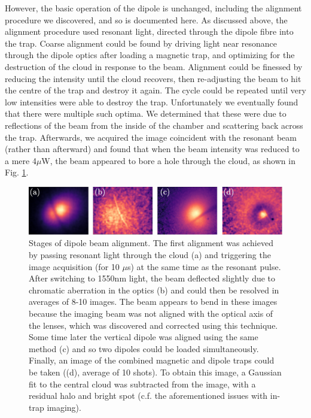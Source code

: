 	However, the basic operation of the dipole is unchanged, including the alignment procedure we discovered, and so is documented here.
	As discussed above, the alignment procedure used resonant light, directed through the dipole fibre into the trap.
	Coarse alignment could be found by driving light near resonance through the dipole optics after loading a magnetic trap, and optimizing for the destruction of the cloud in response to the beam.
	Alignment could be finessed by reducing the intensity until the cloud recovers, then re-adjusting the beam to hit the centre of the trap and destroy it again.
	The cycle could be repeated until very low intensities were able to destroy the trap.
	Unfortunately we eventually found that there were multiple such optima.
	We determined that these were due to reflections of the beam from the inside of the chamber and scattering back across the trap.
	Afterwards, we acquired the image coincident with the resonant beam (rather than afterward) and found that when the beam intensity was reduced to a mere 4$\mu$W, the beam appeared to bore a hole through the cloud, as shown in Fig.	\ref{fig:dipole_align}.
	
	\begin{figure}
	\centering
	\includegraphics[width=\textwidth]{fig/lattice/dipole_alignment_stages}
		\caption{Stages of dipole beam alignment.
	The first alignment was achieved by passing resonant light through the cloud (a) and triggering the image acquisition (for 10 $\mu$s) at the same time as the resonant pulse.
	After switching to 1550nm light, the beam deflected slightly due to chromatic aberration in the optics (b) and could then be resolved in averages of 8-10 images. 
	The beam appears to bend in these images because the imaging beam was not aligned with the optical axis of the lenses, which was discovered and corrected using this technique.
	Some time later the vertical dipole was aligned using the same method (c) and so two dipoles could be loaded simultaneously. 
	Finally, an image of the combined magnetic and dipole traps could be taken ((d), average of 10 shots). To obtain this image, a Gaussian fit to the central cloud was subtracted from the image, with a residual halo and bright spot (c.f. the aforementioned issues with in-trap imaging).}
	\label{fig:dipole_align}
	\end{figure}

